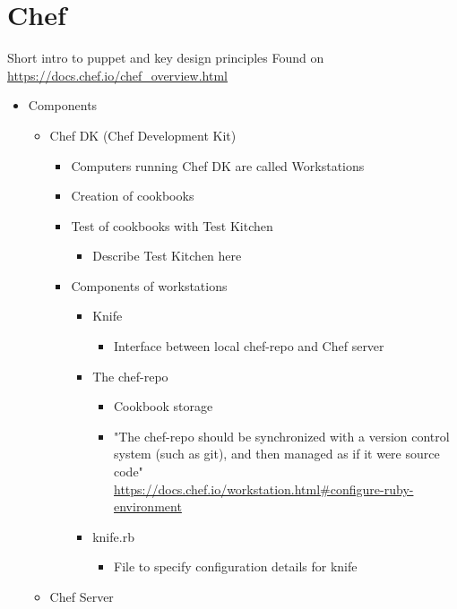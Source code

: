 \section{Chef}
	Short intro to puppet and key design principles
	Found on \url{https://docs.chef.io/chef_overview.html}
	\begin{itemize}
		\item Components
			\begin{itemize}
				\item Chef DK (Chef Development Kit)
					\begin{itemize}
						\item Computers running Chef DK are called Workstations
						\item Creation of cookbooks
						\item Test of cookbooks with Test Kitchen
							\begin{itemize}
								\item Describe Test Kitchen here
							\end{itemize}
						\item Components of workstations
							\begin{itemize}
								\item Knife
									\begin{itemize}
										\item Interface between local chef-repo and Chef server
									\end{itemize}
								\item The chef-repo
									\begin{itemize}
										\item Cookbook storage
										\item "The chef-repo should be synchronized with a version control system (such as git), and then managed as if it were source code"\\ {\tiny \url{https://docs.chef.io/workstation.html#configure-ruby-environment}}
									\end{itemize}
								\item knife.rb
									\begin{itemize}
										\item File to specify configuration details for knife
									\end{itemize}
							\end{itemize}
					\end{itemize}
				\item Chef Server
					\begin{itemize}

\end{itemize}
\end{itemize}
\end{itemize}
